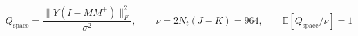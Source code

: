 \documentclass{article}
\begin{document}
\fontsize{22}{29}\selectfont
\[
Q_{\mathrm{space}}=\frac{\|Y(I-MM^+)\|_F^2}{\sigma^2},\qquad \nu=2N_t(J-K)=964,\qquad\mathbb E[Q_{\mathrm{space}}/\nu]=1
\]
\end{document}
